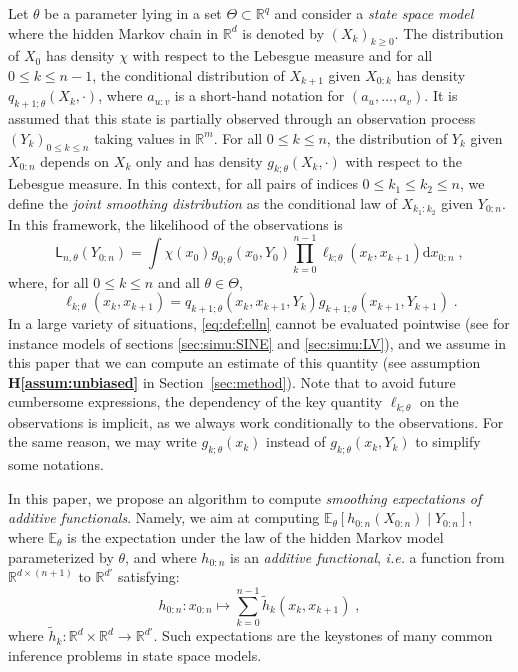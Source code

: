 \documentclass[12pt]{article}
\newcommand{\md}[1]{g_{#1}}
\newcommand{\llh}[1]{\mathsf{L}_{#1}}
\newcommand{\parvec}{\theta}
\newcommand{\parspace}{\Theta}
\newcommand{\af}[1]{h_{#1}}
\newcommand{\hd}[1]{q_{#1}}
\newcommand{\addf}[1]{\termletter_{#1}}
\newcommand{\termletter}{\tilde{h}}
\def\pE{\mathbb{E}}
\newcommand{\rset}{\ensuremath{\mathbb{R}}}
\newcommand{\rmd}{\ensuremath{\mathrm{d}}}
\newcommand{\eqsp}{\;}
\newcommand{\qg}[1]{\ell_{#1}}
\begin{document}
Let $\parvec$ be a parameter lying in a set $\Theta\subset \rset^q$ and consider a  \textit{state space model} where the hidden Markov chain  in $\rset^d$ is denoted by $(X_k)_{k\geqslant 0}$. The distribution of $X_0$ has density $\chi$ with respect to the Lebesgue measure and for all $0\leqslant k \leqslant n-1$, the conditional distribution of $X_{k+1} $ given $X_{0:k}$ has density $\hd{k+1;\parvec}(X_{k},\cdot)$, where $a_{u:v}$ is a short-hand notation for $(a_u,\ldots,a_v)$. 
It is assumed that this state  is partially observed  through an observation process $(Y_k)_{0\leqslant k \leqslant n}$ taking values in $\rset^m$. 
For all $0\leqslant k \leqslant n$, the distribution of $Y_k$ given $X_{0:n}$ depends on $X_k$ only and has density $\md{k;\parvec}(X_k,\cdot)$ with respect to the Lebesgue measure. 
In this context, for all pairs of indices $0\leqslant k_1 \leqslant k_2 \leqslant n$, we define the \textit{joint smoothing distribution} as the conditional law of $X_{k_1:k_2}$ given $Y_{0:n}$. 
In this framework, the likelihood of the observations  is
$$
\llh{n,\parvec}(Y_{0:n})  = \int \chi(x_0)\md{0;\parvec}(x_{0},Y_{0})\prod_{k=0}^{n-1}\qg{k;\parvec}(x_{k},x_{k+1})\rmd x_{0:n}\eqsp,
$$
 where, for all $0\leqslant k \leqslant n$ and all $\parvec\in\parspace$,
\begin{equation}
\label{eq:def:elln}
\qg{k;\parvec}(x_{k},x_{k+1}) = \hd{k+1;\parvec}(x_{k}, x_{k+1}, Y_{k})\md{k+1;\parvec}(x_{k+1},Y_{k+1})\eqsp.
\end{equation}
In a large variety of situations, \eqref{eq:def:elln} cannot be evaluated pointwise  (see for instance models of sections \ref{sec:simu:SINE} and \ref{sec:simu:LV}), and we assume in this paper that we can compute an estimate of this quantity (see assumption \textbf{H\ref{assum:unbiased}} in Section~\ref{sec:method}).
Note that to avoid future cumbersome expressions, the dependency of the key quantity $\qg{k;\parvec}$ on the observations is implicit, as we always work conditionally to the observations. For the same reason, we may write $\md{k;\parvec}(x_{k})$ instead of $\md{k;\parvec}(x_{k},Y_{k})$ to simplify some notations.


In this paper, we propose an algorithm to compute \textit{smoothing expectations of additive functionals}. 
Namely, we aim at computing $\pE_\parvec \left[\af{0:n}(X_{0:n})\middle | Y_{0:n}\right]$,  where $\pE_\parvec$ is the expectation under the law of the hidden Markov model parameterized by $\parvec$, and where $\af{0:n}$ is an \textit{additive functional}, \textit{i.e.} a function from $\rset^{d \times (n + 1)}$ to $\rset^{d'}$ satisfying:
\begin{equation}
\label{eq:additive:functional}
\af{0:n}: x_{0:n} \mapsto \sum_{k=0}^{n-1}\addf{k}(x_{k},x_{k+1})\eqsp,
\end{equation}
where $\addf{k}:\rset^{d} \times \rset^{d}\to\rset^{d'}$.
Such expectations are the keystones of many common inference problems in state space models.
\end{document}
